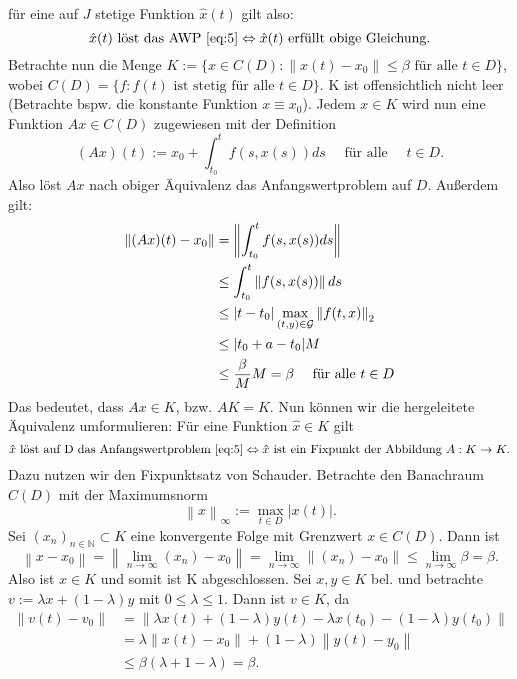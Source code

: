 für eine auf $J$ stetige Funktion $\hat{x}(t)$ gilt also:
\[
    \hat{x}(t) \text{ löst das AWP \eqref{eq:5}}  \Leftrightarrow \hat{x}(t) \text{ erfüllt obige Gleichung.}
\]
Betrachte nun die Menge $K := \{ x \in C(D): \left\lVert x(t) - x_0 \right\rVert \leq \beta \text{ für alle } t \in D \}$,
wobei $C(D)=\{f: f(t) \text{ ist stetig für alle } t \in D \}$. K ist offensichtlich nicht leer (Betrachte bspw. die
konstante Funktion $x \equiv x_0$). Jedem $x \in K$ wird nun eine Funktion $Ax \in C(D)$ zugewiesen mit der Definition
\[
    (Ax)(t) := x_0 + \int_{t_0}^{t} f(s, x(s)) ds \quad \text{ für alle } \quad t \in D.
\]
Also löst $Ax$ nach obiger Äquivalenz das Anfangswertproblem auf $D$. Außerdem gilt:
\begin{align*}
    \left\lVert (Ax)(t) - x_0 \right\rVert &= \left\lVert \int_{t_0}^{t} f(s, x(s)) ds \right\rVert \\
    &\leq \int_{t_0}^{t} \left\lVert f(s, x(s)) \right\rVert ds \\
    &\leq |t - t_0| \max_{(t,y)\in {\cal G}}\left\lVert f(t,x)\right\rVert_{2} \\
    &\leq |t_0 + a - t_0| M \\
    &\leq \frac{\beta}{M}M = \beta \quad \text{ für alle } t \in D
\end{align*}
Das bedeutet, dass $Ax \in K$, bzw. $AK = K$. Nun können wir die hergeleitete Äquivalenz umformulieren:
Für eine Funktion $\hat{x} \in K$ gilt
\[
    \hat{x} \text{ löst auf D das Anfangswertproblem } \eqref{eq:5} \Leftrightarrow \hat{x}
    \text{ ist ein Fixpunkt der Abbildung } A:K \rightarrow K.
\]
Dazu nutzen wir den Fixpunktsatz von Schauder. Betrachte den Banachraum $C(D)$ mit der Maximumsnorm
\[
    \left\lVert x \right\rVert_{\infty}:=\max_{t \in D} |x(t)|.
\]
Sei $(x_n)_{n \in \mathbb{N}} \subset K$ eine konvergente Folge mit Grenzwert $x \in C(D)$. Dann ist
\[
    \left\lVert x - x_0 \right\rVert = \left\lVert \lim_{n \rightarrow \infty}(x_n) - x_0 \right\rVert
    = \lim_{n \rightarrow \infty} \left\lVert (x_n) - x_0 \right\rVert \leq \lim_{n \rightarrow \infty} \beta = \beta.
\]
Also ist $x \in K$ und somit ist K abgeschlossen. Sei $x,y \in K $ bel. und betrachte $v:=\lambda x + (1-\lambda)y$
mit $0 \leq \lambda \leq 1$. Dann ist $v \in K$, da
\begin{align*}
    \left\lVert v(t) - v_0 \right\rVert
    &= \left\lVert \lambda x(t) + (1-\lambda)y(t) - \lambda x(t_0) - (1-\lambda)y(t_0) \right\rVert \\
    &= \lambda \left\lVert x(t) - x_0 \right\rVert + (1 - \lambda) \left\lVert y(t) - y_0 \right\rVert \\
    &\leq \beta (\lambda + 1 - \lambda) = \beta.
\end{align*}
